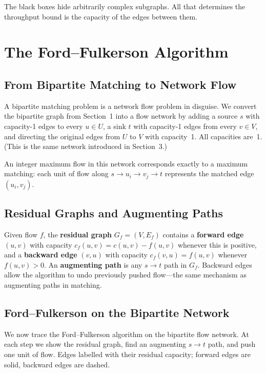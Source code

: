 \documentclass[11pt]{article}
\begin{document}
The black boxes hide arbitrarily complex subgraphs.  All that
determines the throughput bound is the capacity of the edges
between them.

\section{The Ford--Fulkerson Algorithm}

\subsection{From Bipartite Matching to Network Flow}

A bipartite matching problem is a network flow problem in
disguise.  We convert the bipartite graph from Section~1 into a
flow network by adding a source $s$ with capacity-1 edges to
every $u \in U$, a sink $t$ with capacity-1 edges from every
$v \in V$, and directing the original edges from $U$ to $V$ with
capacity~1.  All capacities are~1.  (This is the same network
introduced in Section~3.)

An integer maximum flow in this network corresponds exactly to a
maximum matching: each unit of flow along
$s \to u_i \to v_j \to t$ represents the matched edge
$(u_i, v_j)$.

\subsection{Residual Graphs and Augmenting Paths}

Given flow $f$, the \textbf{residual graph} $G_f = (V, E_f)$
contains a \textbf{forward edge} $(u,v)$ with capacity
$c_f(u,v) = c(u,v) - f(u,v)$ whenever this is positive, and a
\textbf{backward edge} $(v,u)$ with capacity $c_f(v,u) = f(u,v)$
whenever $f(u,v) > 0$.  An \textbf{augmenting path} is any
$s \to t$ path in $G_f$.  Backward edges allow the algorithm to
undo previously pushed flow---the same mechanism as augmenting
paths in matching.

\subsection{Ford--Fulkerson on the Bipartite Network}

We now trace the Ford--Fulkerson algorithm on the bipartite flow
network.  At each step we show the residual graph, find an
augmenting $s \to t$ path, and push one unit of flow.  Edges
labelled with their residual capacity; forward edges are solid,
backward edges are dashed.
\end{document}
